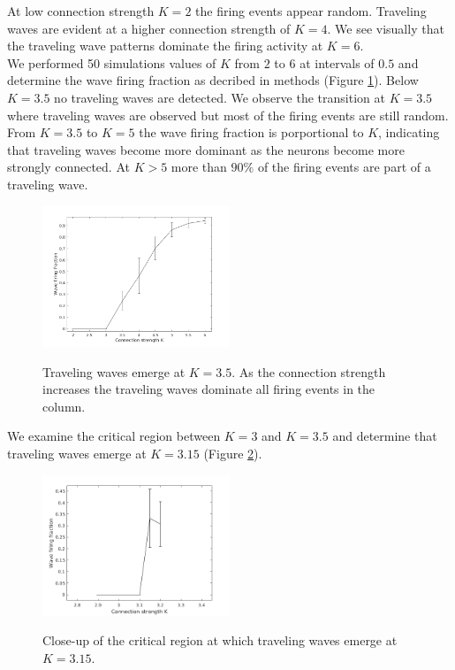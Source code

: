 \documentclass[a4paper,11pt]{article}
\begin{document}
At low connection strength $K=2$ the firing events appear random.
Traveling waves are evident at a higher connection strength of $K=4$.
We see visually that the traveling wave patterns dominate the firing activity at $K=6$. \\
We performed 50 simulations values of $K$ from $2$ to $6$ at intervals of $0.5$ and determine the wave firing fraction as decribed in methods (Figure \ref{fig:conn_fraction}).
Below $K=3.5$ no traveling waves are detected.
We observe the transition at $K=3.5$ where traveling waves are observed but most of the firing events are still random.
From $K=3.5$ to $K=5$ the wave firing fraction is porportional to $K$, indicating that traveling waves become more dominant as the neurons become more strongly connected.
At $K>5$ more than $90\%$ of the firing events are part of a traveling wave.
\begin{figure}[!htb]
 \caption{Traveling waves emerge at $K=3.5$. As the connection strength increases the traveling waves dominate all firing events in the column.}
 \centering
   \includegraphics[width=0.5\textwidth]{fig/ConnectionStrengthWaveFraction}  
 \label{fig:conn_fraction}
\end{figure}
We examine the critical region between $K=3$ and $K=3.5$ and determine that traveling waves emerge at $K=3.15$ (Figure \ref{fig:conn_fraction_critical}).
\begin{figure}[!htb]
 \caption{Close-up of the critical region at which traveling waves emerge at $K=3.15$.}
 \centering
   \includegraphics[width=0.5\textwidth]{fig/ConnectionStrengthWaveFraction_CriticalRegion}  
 \label{fig:conn_fraction_critical}
\end{figure}
\end{document}
